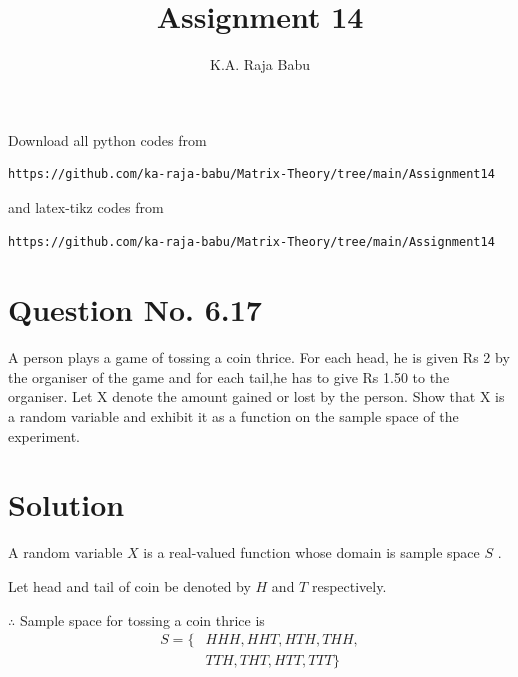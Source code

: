\documentclass[journal,12pt,twocolumn]{IEEEtran}
\begin{document}
\makeatother
\let\StandardTheFigure\thefigure
\let\vec\mathbf
\renewcommand{\thefigure}{\theproblem}
\def\putbox#1#2#3{\makebox[0in][l]{\makebox[#1][l]{}\raisebox{\baselineskip}[0in][0in]{\raisebox{#2}[0in][0in]{#3}}}}
     \def\rightbox#1{\makebox[0in][r]{#1}}
     \def\centbox#1{\makebox[0in]{#1}}
     \def\topbox#1{\raisebox{-\baselineskip}[0in][0in]{#1}}
     \def\midbox#1{\raisebox{-0.5\baselineskip}[0in][0in]{#1}}
\vspace{3cm}
\title{Assignment 14}
\author{K.A. Raja Babu}
\maketitle
\newpage
\bigskip
\renewcommand{\thefigure}{\theenumi}
\renewcommand{\thetable}{\theenumi}
Download all python codes from 
\begin{lstlisting}
https://github.com/ka-raja-babu/Matrix-Theory/tree/main/Assignment14
\end{lstlisting}
%
and latex-tikz codes from 
%
\begin{lstlisting}
https://github.com/ka-raja-babu/Matrix-Theory/tree/main/Assignment14
\end{lstlisting}
%
\section{Question No. 6.17}

A person plays a game of tossing a coin thrice. For each head, he is given Rs 2 by the organiser of the game and for each tail,he has to give Rs 1.50 to the organiser. Let X denote the amount gained or lost by the person. Show that X is a random variable and exhibit it as a function on the sample space of the experiment.

\section{Solution}

\begin{axiom}
A random variable $X$ is a real-valued function whose domain is sample space $S$ . \label{axiom1}
\end{axiom}

Let head and tail of coin be denoted by $H$ and $T$ respectively.

$\therefore$ Sample space for tossing a coin thrice is 
\begin{align}
    S= \{ &HHH,HHT,HTH,THH, \\
    &TTH,THT,HTT,TTT \}
\end{align}
\end{document}
